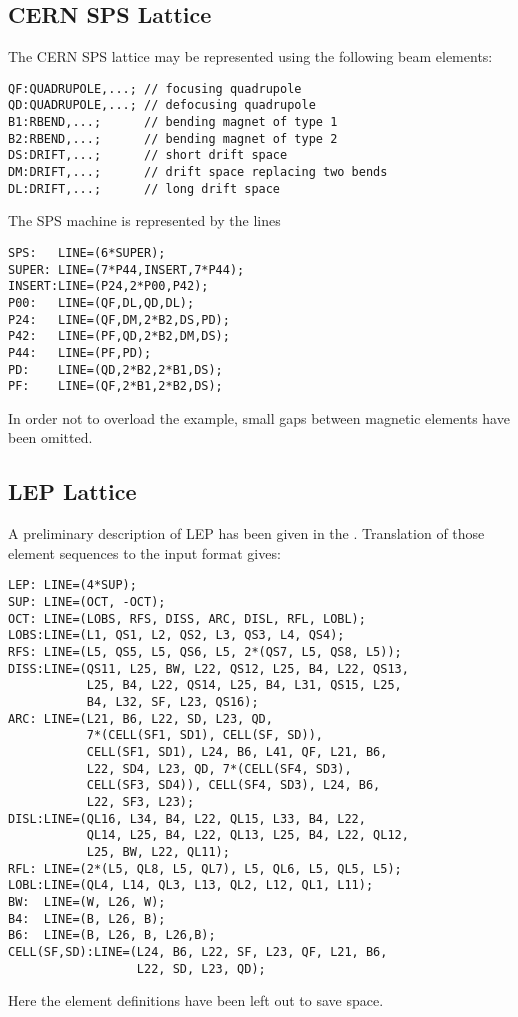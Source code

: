 \subsection{CERN SPS Lattice}
\label{sec:sps}
The CERN SPS lattice may be represented using the following beam elements:
\begin{verbatim}
QF:QUADRUPOLE,...; // focusing quadrupole
QD:QUADRUPOLE,...; // defocusing quadrupole
B1:RBEND,...;      // bending magnet of type 1
B2:RBEND,...;      // bending magnet of type 2
DS:DRIFT,...;      // short drift space
DM:DRIFT,...;      // drift space replacing two bends
DL:DRIFT,...;      // long drift space
\end{verbatim}
The SPS machine is represented by the lines
\begin{verbatim}
SPS:   LINE=(6*SUPER);
SUPER: LINE=(7*P44,INSERT,7*P44);
INSERT:LINE=(P24,2*P00,P42);
P00:   LINE=(QF,DL,QD,DL);
P24:   LINE=(QF,DM,2*B2,DS,PD);
P42:   LINE=(PF,QD,2*B2,DM,DS);
P44:   LINE=(PF,PD);
PD:    LINE=(QD,2*B2,2*B1,DS);
PF:    LINE=(QF,2*B1,2*B2,DS);
\end{verbatim}
In order not to overload the example,
small gaps between magnetic elements have been omitted.

\subsection{LEP Lattice}
\label{sec:lep}
A preliminary description of LEP has been given in the
.
Translation of those element sequences to the \opal input format gives:
\begin{verbatim}
LEP: LINE=(4*SUP);
SUP: LINE=(OCT, -OCT);
OCT: LINE=(LOBS, RFS, DISS, ARC, DISL, RFL, LOBL);
LOBS:LINE=(L1, QS1, L2, QS2, L3, QS3, L4, QS4);
RFS: LINE=(L5, QS5, L5, QS6, L5, 2*(QS7, L5, QS8, L5));
DISS:LINE=(QS11, L25, BW, L22, QS12, L25, B4, L22, QS13,
           L25, B4, L22, QS14, L25, B4, L31, QS15, L25,
           B4, L32, SF, L23, QS16);
ARC: LINE=(L21, B6, L22, SD, L23, QD,
           7*(CELL(SF1, SD1), CELL(SF, SD)),
           CELL(SF1, SD1), L24, B6, L41, QF, L21, B6,
           L22, SD4, L23, QD, 7*(CELL(SF4, SD3),
           CELL(SF3, SD4)), CELL(SF4, SD3), L24, B6,
           L22, SF3, L23);
DISL:LINE=(QL16, L34, B4, L22, QL15, L33, B4, L22,
           QL14, L25, B4, L22, QL13, L25, B4, L22, QL12,
           L25, BW, L22, QL11);
RFL: LINE=(2*(L5, QL8, L5, QL7), L5, QL6, L5, QL5, L5);
LOBL:LINE=(QL4, L14, QL3, L13, QL2, L12, QL1, L11);
BW:  LINE=(W, L26, W);
B4:  LINE=(B, L26, B);
B6:  LINE=(B, L26, B, L26,B);
CELL(SF,SD):LINE=(L24, B6, L22, SF, L23, QF, L21, B6,
                  L22, SD, L23, QD);
\end{verbatim}
Here the element definitions have been left out to save space.

